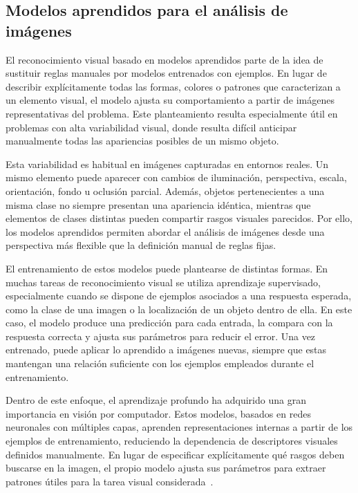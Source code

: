 \subsection{Modelos aprendidos para el análisis de imágenes}

El reconocimiento visual basado en modelos aprendidos parte de la idea de sustituir reglas manuales por modelos entrenados con ejemplos. En lugar de describir explícitamente todas las formas, colores o patrones que caracterizan a un elemento visual, el modelo ajusta su comportamiento a partir de imágenes representativas del problema. Este planteamiento resulta especialmente útil en problemas con alta variabilidad visual, donde resulta difícil anticipar manualmente todas las apariencias posibles de un mismo objeto.

Esta variabilidad es habitual en imágenes capturadas en entornos reales. Un mismo elemento puede aparecer con cambios de iluminación, perspectiva, escala, orientación, fondo u oclusión parcial. Además, objetos pertenecientes a una misma clase no siempre presentan una apariencia idéntica, mientras que elementos de clases distintas pueden compartir rasgos visuales parecidos. Por ello, los modelos aprendidos permiten abordar el análisis de imágenes desde una perspectiva más flexible que la definición manual de reglas fijas.

El entrenamiento de estos modelos puede plantearse de distintas formas. En muchas tareas de reconocimiento visual se utiliza aprendizaje supervisado, especialmente cuando se dispone de ejemplos asociados a una respuesta esperada, como la clase de una imagen o la localización de un objeto dentro de ella. En este caso, el modelo produce una predicción para cada entrada, la compara con la respuesta correcta y ajusta sus parámetros para reducir el error. Una vez entrenado, puede aplicar lo aprendido a imágenes nuevas, siempre que estas mantengan una relación suficiente con los ejemplos empleados durante el entrenamiento.

Dentro de este enfoque, el aprendizaje profundo ha adquirido una gran importancia en visión por computador. Estos modelos, basados en redes neuronales con múltiples capas, aprenden representaciones internas a partir de los ejemplos de entrenamiento, reduciendo la dependencia de descriptores visuales definidos manualmente. En lugar de especificar explícitamente qué rasgos deben buscarse en la imagen, el propio modelo ajusta sus parámetros para extraer patrones útiles para la tarea visual considerada~\cite{lecun2015deepLearning}.


